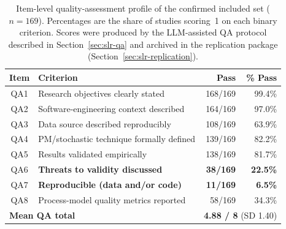 \begin{table}[htbp]
\centering
\caption{Item-level quality-assessment profile of the confirmed included set
($n=169$). Percentages are the share of studies scoring~1 on each binary
criterion. Scores were produced by the LLM-assisted QA protocol described
in Section~\ref{sec:slr-qa} and archived in the replication package
(Section~\ref{sec:slr-replication}).}
\label{tab:qa-peritem}
\small
\begin{tabular}{clrr}
\toprule
\textbf{Item} & \textbf{Criterion} & \textbf{Pass} & \textbf{\% Pass} \\
\midrule
QA1 & Research objectives clearly stated            & 168/169 & 99.4\% \\
QA2 & Software-engineering context described         & 164/169 & 97.0\% \\
QA3 & Data source described reproducibly             & 108/169 & 63.9\% \\
QA4 & PM/stochastic technique formally defined       & 139/169 & 82.2\% \\
QA5 & Results validated empirically                  & 138/169 & 81.7\% \\
QA6 & \textbf{Threats to validity discussed}         & \textbf{38/169}  & \textbf{22.5\%} \\
QA7 & \textbf{Reproducible (data and/or code)}       & \textbf{11/169}  & \textbf{6.5\%}  \\
QA8 & Process-model quality metrics reported         & 58/169  & 34.3\% \\
\midrule
\multicolumn{2}{l}{\textbf{Mean QA total}} & \multicolumn{2}{r}{\textbf{4.88 / 8} (SD 1.40)} \\
\bottomrule
\end{tabular}
\end{table}
